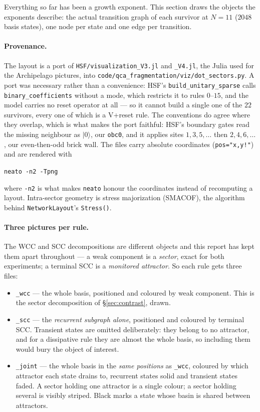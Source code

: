 \documentclass[11pt]{article}
\newcommand{\rt}[1]{\texttt{#1}}
\newcommand{\fn}[1]{\texttt{#1}}
\providecommand{\ket}[1]{|#1\rangle}
\theoremstyle{plain}
\theoremstyle{definition}
\begin{document}
Everything so far has been a growth exponent. This section draws the objects the
exponents describe: the actual transition graph of each survivor at $N=11$
($2048$ basis states), one node per state and one edge per transition.

\paragraph{Provenance.} The layout is a port of \fn{HSF/visualization\_V3.jl} and
\fn{\_V4.jl}, the Julia used for the Archipelago pictures, into
\fn{code/qca\_fragmentation/viz/dot\_sectors.py}. A port was necessary rather
than a convenience: HSF's \fn{build\_unitary\_sparse} calls
\fn{binary\_coefficients} without a mode, which restricts it to rules $0$--$15$,
and the model carries no reset operator at all --- so it cannot build a single
one of the $22$ survivors, every one of which is a V+reset rule. The conventions
do agree where they overlap, which is what makes the port faithful: HSF's
boundary gates read the missing neighbour as $\ket{0}$, our \rt{obc0}, and it
applies sites $1,3,5,\dots$ then $2,4,6,\dots$, our even-then-odd brick wall.
The files carry absolute coordinates (\fn{pos="x,y!"}) and are rendered with
\begin{center}\fn{neato -n2 -Tpng}\end{center}
where \fn{-n2} is what makes \fn{neato} honour the coordinates instead of
recomputing a layout. Intra-sector geometry is stress majorization (SMACOF),
the algorithm behind \fn{NetworkLayout}'s \fn{Stress()}.

\paragraph{Three pictures per rule.} The WCC and SCC decompositions are different
objects and this report has kept them apart throughout --- a weak component is a
\emph{sector}, exact for both experiments; a terminal SCC is a \emph{monitored
attractor}. So each rule gets three files:

\begin{itemize}
\item \fn{\_wcc} --- the whole basis, positioned and coloured by weak component.
  This is the sector decomposition of \S\ref{sec:contrast}, drawn.
\item \fn{\_scc} --- the \emph{recurrent subgraph alone}, positioned and coloured
  by terminal SCC. Transient states are omitted deliberately: they belong to no
  attractor, and for a dissipative rule they are almost the whole basis, so
  including them would bury the object of interest.
\item \fn{\_joint} --- the whole basis in the \emph{same positions} as
  \fn{\_wcc}, coloured by which attractor each state drains to, recurrent states
  solid and transient states faded. A sector holding one attractor is a single
  colour; a sector holding several is visibly striped. Black marks a state whose
  basin is shared between attractors.
\end{itemize}
\end{document}
